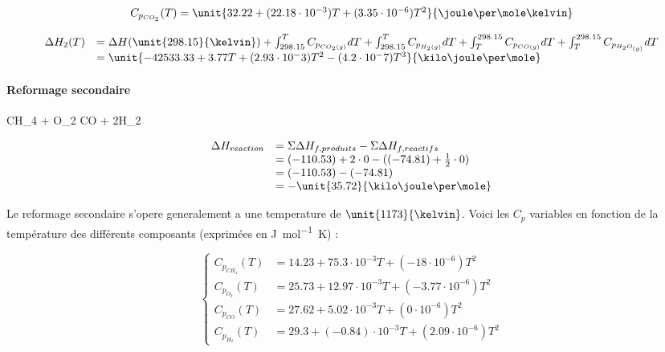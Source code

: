 $$
\begin{array}{rl}
C_{p_{CO_2}}(T) = \unit{32.22 +(22.18 \cdot 10^{-3})T + (3.35 \cdot 10^{-6})T^2}{\joule\per\mole\kelvin} \\
\end{array}
$$

$$
	\begin{array}{rl}
		  \Delta H_2(T)	&=   \Delta H(\unit{298.15}{\kelvin}) 
											 + \int_{298.15}^{T} C_{p_{CO_2(g)}} dT + \int_{298.15}^{T} C_{p_{H_2(g)}} dT 
											 +  \int_{T}^{298.15} C_{p_{CO(g)}} dT + \int_{T}^{298.15}C_{p_{H_{2}O_{(g)}}}dT \\
										&=  \unit{-42533.33+3.77T+(2.93\cdot 10^-3)T^2-(4.2\cdot 10^-7)T^3}{\kilo\joule\per\mole}
	\end{array}
$$	

\paragraph{Reformage secondaire}

\begin{chemmath}
		CH_4 + O_2 \Longrightarrow CO + 2H_2
\end{chemmath}

$$
	\begin{array}{rl}
	\Delta H_{reaction}		&= \Sigma \Delta H_{f,produits} - \Sigma \Delta H_{f,reactifs}\\
												&= (-110.53) + 2\cdot 0 - ((-74.81) + \frac{1}{2}\cdot 0)\\
												&=  (-110.53) - (-74.81)\\
												&=  -\unit{35.72}{\kilo\joule\per\mole}
	\end{array}
$$

Le reformage secondaire s'opere generalement a une temperature de $\unit{1173}{\kelvin}$.
Voici les $C_p$ variables en fonction de la température des différents composants\cite{hc-table} 
(exprimées en \unit{\joule\per\mole\kelvin}) :

$$
	\left\{
		\begin{array}{rl}
			C_{p_{CH_4}}(T) 	&= 14.23 + 75.3\cdot10^{-3}T + (-18\cdot10^{-6})T^2 \\
			C_{p_{O_2}}(T) 		&= 25.73 + 12.97\cdot10^{-3}T + (-3.77\cdot10^{-6})T^2 \\
			C_{p_{CO}}(T) 		&= 27.62 + 5.02\cdot10^{-3}T + (0\cdot10^{-6})T^2 \\
			C_{p_{H_2}}(T) 		&= 29.3 + (-0.84)\cdot10^{-3}T + (2.09\cdot10^{-6})T^2
		\end{array}
	\right.
$$

